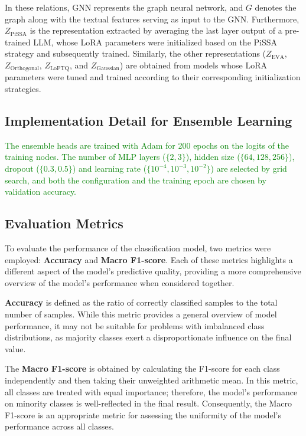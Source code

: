 \documentclass[a4paper,fleqn]{cas-sc}
\newcommand{\revthree}[1]{\textcolor{green}{#1}} %
\begin{document}
In these relations, $\mathrm{GNN}$ represents the graph neural network, and $G$ denotes the graph along with the textual features serving as input to the GNN. Furthermore, $Z_{\text{PiSSA}}$ is the representation extracted by averaging the last layer output of a pre-trained LLM, whose LoRA parameters were initialized based on the PiSSA strategy and subsequently trained. Similarly, the other representations ($Z_{\text{EVA}}$, $Z_{\text{Orthogonal}}$, $Z_{\text{LoFTQ}}$, and $Z_{\text{Gaussian}}$) are obtained from models whose LoRA parameters were tuned and trained according to their corresponding initialization strategies.

\subsection{Implementation Detail for Ensemble Learning}
\revthree{The ensemble heads are trained with Adam for 200 epochs on the logits of the training nodes. The number of MLP layers ($\{2,3\}$), hidden size ($\{64,128,256\}$), dropout ($\{0.3,0.5\}$) and learning rate ($\{10^{-4},10^{-3},10^{-2}\}$) are selected by grid search, and both the configuration and the training epoch are chosen by validation accuracy.}

\subsection{Evaluation Metrics}
To evaluate the performance of the classification model, two metrics were employed: \textbf{Accuracy} and \textbf{Macro F1-score}. Each of these metrics highlights a different aspect of the model's predictive quality, providing a more comprehensive overview of the model's performance when considered together.

\textbf{Accuracy} is defined as the ratio of correctly classified samples to the total number of samples. While this metric provides a general overview of model performance, it may not be suitable for problems with imbalanced class distributions, as majority classes exert a disproportionate influence on the final value.

The \textbf{Macro F1-score} is obtained by calculating the F1-score for each class independently and then taking their unweighted arithmetic mean. In this metric, all classes are treated with equal importance; therefore, the model's performance on minority classes is well-reflected in the final result. Consequently, the Macro F1-score is an appropriate metric for assessing the uniformity of the model's performance across all classes.
\end{document}
